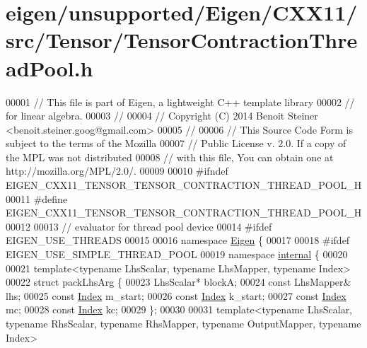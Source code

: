 \hypertarget{eigen_2unsupported_2_eigen_2_c_x_x11_2src_2_tensor_2_tensor_contraction_thread_pool_8h_source}{}\section{eigen/unsupported/\+Eigen/\+C\+X\+X11/src/\+Tensor/\+Tensor\+Contraction\+Thread\+Pool.h}
\label{eigen_2unsupported_2_eigen_2_c_x_x11_2src_2_tensor_2_tensor_contraction_thread_pool_8h_source}

\begin{DoxyCode}
00001 \textcolor{comment}{// This file is part of Eigen, a lightweight C++ template library}
00002 \textcolor{comment}{// for linear algebra.}
00003 \textcolor{comment}{//}
00004 \textcolor{comment}{// Copyright (C) 2014 Benoit Steiner <benoit.steiner.goog@gmail.com>}
00005 \textcolor{comment}{//}
00006 \textcolor{comment}{// This Source Code Form is subject to the terms of the Mozilla}
00007 \textcolor{comment}{// Public License v. 2.0. If a copy of the MPL was not distributed}
00008 \textcolor{comment}{// with this file, You can obtain one at http://mozilla.org/MPL/2.0/.}
00009 
00010 \textcolor{preprocessor}{#ifndef EIGEN\_CXX11\_TENSOR\_TENSOR\_CONTRACTION\_THREAD\_POOL\_H}
00011 \textcolor{preprocessor}{#define EIGEN\_CXX11\_TENSOR\_TENSOR\_CONTRACTION\_THREAD\_POOL\_H}
00012 
00013 \textcolor{comment}{// evaluator for thread pool device}
00014 \textcolor{preprocessor}{#ifdef EIGEN\_USE\_THREADS}
00015 
00016 \textcolor{keyword}{namespace }\hyperlink{namespace_eigen}{Eigen} \{
00017 
00018 \textcolor{preprocessor}{#ifdef EIGEN\_USE\_SIMPLE\_THREAD\_POOL}
00019 \textcolor{keyword}{namespace }\hyperlink{namespaceinternal}{internal} \{
00020 
00021 \textcolor{keyword}{template}<\textcolor{keyword}{typename} LhsScalar, \textcolor{keyword}{typename} LhsMapper, \textcolor{keyword}{typename} Index>
00022 \textcolor{keyword}{struct }packLhsArg \{
00023   LhsScalar* blockA;
00024   \textcolor{keyword}{const} LhsMapper& lhs;
00025   \textcolor{keyword}{const} \hyperlink{namespace_eigen_a62e77e0933482dafde8fe197d9a2cfde}{Index} m\_start;
00026   \textcolor{keyword}{const} \hyperlink{namespace_eigen_a62e77e0933482dafde8fe197d9a2cfde}{Index} k\_start;
00027   \textcolor{keyword}{const} \hyperlink{namespace_eigen_a62e77e0933482dafde8fe197d9a2cfde}{Index} mc;
00028   \textcolor{keyword}{const} \hyperlink{namespace_eigen_a62e77e0933482dafde8fe197d9a2cfde}{Index} kc;
00029 \};
00030 
00031 \textcolor{keyword}{template}<\textcolor{keyword}{typename} LhsScalar, \textcolor{keyword}{typename} RhsScalar, \textcolor{keyword}{typename} RhsMapper, \textcolor{keyword}{typename} OutputMapper, \textcolor{keyword}{typename} Index>

\end{DoxyCode}
